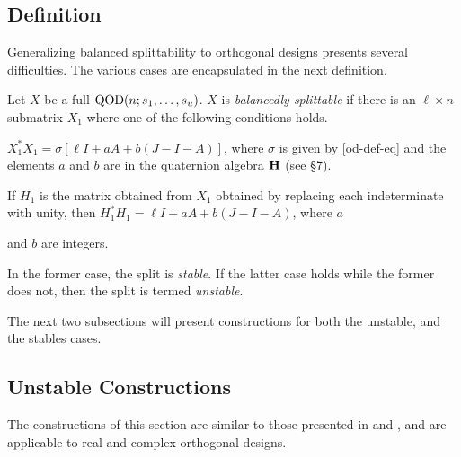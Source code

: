 \documentclass[../../../main]{subfiles}
\begin{document}
\subsection{Definition}

Generalizing balanced splittability to orthogonal designs presents several
difficulties. The various cases are encapsulated in the next definition. 

\begin{defin}
 Let $X$ be a full $\text{QOD}(n;s_1, \dots, s_u)$. $X$ is {\it balancedly splittable}
 if there is an $\ell \times n$ submatrix $X_1$ where one of the following
 conditions holds.
 \begin{defenum}
 \item $X_1^*X_1 = \sigma[\ell I + aA + b(J-I-A)]$, where $\sigma$ is given by
   \ref{od-def-eq} and the elements $a$ and $b$ are in the quaternion algebra
   $\mathbf{H}$ (see \S7).
 \item If $H_1$ is the matrix obtained from $X_1$ obtained by replacing each
   indeterminate with unity, then $H_1^*H_1 = \ell I + aA + b(J-I-A)$, where $a$

   and $b$ are integers.
 \end{defenum}
 In the former case, the split is {\it stable}. If the latter case holds while
 the former does not, then the split is termed {\it unstable}.
\end{defin}

The next two subsections will present constructions for both the unstable, and
the stables cases. 

\dinkus

\subsection{Unstable Constructions}

The constructions of this section are similar to those presented in \cite{fender-quh} and \cite{pender_2020}, and are applicable to real and complex orthogonal designs.
\end{document}
